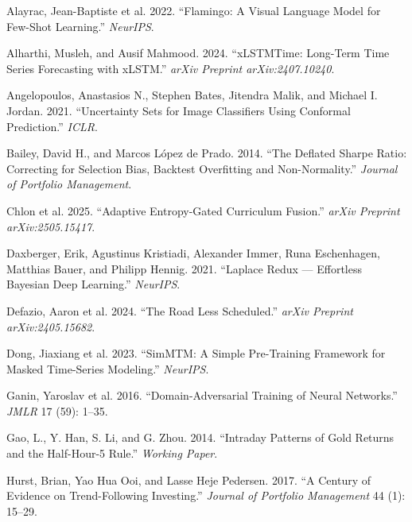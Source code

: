 \documentclass[
]{article}
\newlength{\cslhangindent}
\newenvironment{CSLReferences}[2] %
 {\begin{list}{}{%
  \setlength{\itemindent}{0pt}
  \setlength{\leftmargin}{0pt}
  \setlength{\parsep}{0pt}
  \ifodd #1
   \setlength{\leftmargin}{\cslhangindent}
   \setlength{\itemindent}{-1\cslhangindent}
  \fi
  \setlength{\itemsep}{#2\baselineskip}}}
 {\end{list}}
\begin{document}
\protect{}\label{refs}
\begin{CSLReferences}{1}{1}
{Alayrac, Jean-Baptiste et al.} 2022. {``Flamingo: A Visual Language
Model for Few-Shot Learning.''} \emph{NeurIPS}.

Alharthi, Musleh, and Ausif Mahmood. 2024. {``xLSTMTime: Long-Term Time
Series Forecasting with xLSTM.''} \emph{arXiv Preprint
arXiv:2407.10240}.

Angelopoulos, Anastasios N., Stephen Bates, Jitendra Malik, and Michael
I. Jordan. 2021. {``Uncertainty Sets for Image Classifiers Using
Conformal Prediction.''} \emph{ICLR}.

Bailey, David H., and Marcos López de Prado. 2014. {``The Deflated
Sharpe Ratio: Correcting for Selection Bias, Backtest Overfitting and
Non-Normality.''} \emph{Journal of Portfolio Management}.

{Chlon et al.} 2025. {``Adaptive Entropy-Gated Curriculum Fusion.''}
\emph{arXiv Preprint arXiv:2505.15417}.

Daxberger, Erik, Agustinus Kristiadi, Alexander Immer, Runa Eschenhagen,
Matthias Bauer, and Philipp Hennig. 2021. {``Laplace Redux ---
Effortless Bayesian Deep Learning.''} \emph{NeurIPS}.

{Defazio, Aaron et al.} 2024. {``The Road Less Scheduled.''} \emph{arXiv
Preprint arXiv:2405.15682}.

{Dong, Jiaxiang et al.} 2023. {``SimMTM: A Simple Pre-Training Framework
for Masked Time-Series Modeling.''} \emph{NeurIPS}.

{Ganin, Yaroslav et al.} 2016. {``Domain-Adversarial Training of Neural
Networks.''} \emph{JMLR} 17 (59): 1--35.

Gao, L., Y. Han, S. Li, and G. Zhou. 2014. {``Intraday Patterns of Gold
Returns and the Half-Hour-5 Rule.''} \emph{Working Paper}.

Hurst, Brian, Yao Hua Ooi, and Lasse Heje Pedersen. 2017. {``A Century
of Evidence on Trend-Following Investing.''} \emph{Journal of Portfolio
Management} 44 (1): 15--29.


\end{CSLReferences}
\end{document}
